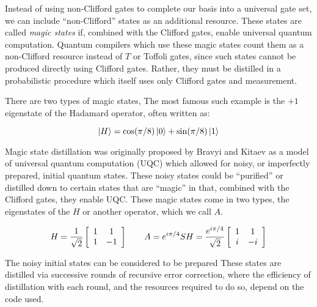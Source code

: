 Instead of using non-Clifford gates to complete our basis into a universal
gate set, we can include ``non-Clifford'' states as an additional resource.
These states are called \emph{magic states} if, combined with the Clifford
gates, enable universal quantum computation.
Quantum compilers which use these magic states count them as a non-Clifford
resource instead of $T$ or Toffoli gates, since such states cannot
be produced directly using Clifford gates. Rather, they must be
distilled in a probabilistic procedure which itself uses only 
Clifford gates and measurement.

There are two types of magic states, 
The most famous such example is the $+1$ eigenstate of the Hadamard operator,
often written as:

\begin{equation}
\left\vert{H}\right\rangle = \cos(\pi/8)\left\vert{0}\right\rangle + \sin(\pi/8)\left\vert{1}\right\rangle
\end{equation}

Magic state distillation was originally proposed by Bravyi and Kitaev
\cite{Bravyi2005} as a model of universal quantum computation (UQC) which
allowed for noisy, or imperfectly prepared, initial quantum states. These
noisy states could be ``purified'' or distilled down to certain states
that are ``magic'' in that, combined with the Clifford gates, they enable
UQC. These magic states come in two types, the eigenstates
of the $H$ or another operator, which we call $A$.

\begin{equation}
H = 
\frac{1}{\sqrt{2}}
\left[ \begin{array}{cc}
1 & 1\\
1 & -1
\end{array} \right]
\qquad
A = e^{i\pi / 4} SH = \frac{e^{i\pi/4}}{\sqrt{2}}
\left[ \begin{array}{cc}
1 & 1\\
i & -i
\end{array} \right]
\label{eqn:T}
\end{equation}

The noisy initial states can be considered to be prepared
These states are distilled via successive rounds of recursive error
correction, where the efficiency of distillation with each round,
and the resources required to do so, depend on the code used.



